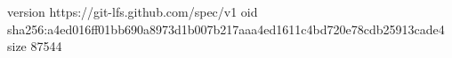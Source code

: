 version https://git-lfs.github.com/spec/v1
oid sha256:a4ed016ff01bb690a8973d1b007b217aaa4ed1611c4bd720e78cdb25913cade4
size 87544
